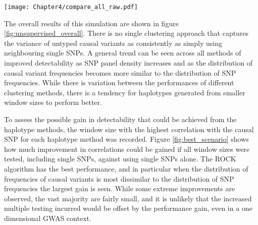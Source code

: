 \begin{sidewaysfigure}
\begin{center}
\begin{center}
\texttt{[image: Chapter4/compare\_all\_raw.pdf]}
\caption[Detection of hidden variants using unsupervised haplotype clustering]{Detection of `untyped' causal variants in different genomic architectures. Box and whisker plots show the distribution of best correlations between causal variant and clustered SNPs (rows 1-4) or single SNPs (row 5), for different causal variant frequency distributions (columns of boxes), and different SNP chip densities ($x$ axis). Each distribution comprises 500 simulated causal variants. Box and whisper plots represent, from top to bottom, $95^{th}$, $75^{th}$, $50^{th}$, $25^{th}$ and $5^{th}$ percentile values for the distribution of correlation values.}
\label{fig:unsupervised_overall}
\end{center}
\end{center}
\end{sidewaysfigure}

The overall results of this simulation are shown in figure \ref{fig:unsupervised_overall}. There is no single clustering approach that captures the variance of untyped causal variants as consistently as simply using neighbouring single SNPs. A general trend can be seen across all methods of improved detectability as SNP panel density increases and as the distribution of causal variant frequencies becomes more similar to the distribution of SNP frequencies. While there is variation between the performances of different clustering methods, there is a tendency for haplotypes generated from smaller window sizes to perform better.

To assess the possible gain in detectability that could be achieved from the haplotype methods, the window size with the highest correlation with the causal SNP for each haplotype method was recorded. Figure \ref{fig:best_scenario} shows how much improvement in correlations could be gained if all window sizes were tested, including single SNPs, against using single SNPs alone. The ROCK algorithm has the best performance, and in particular when the distribution of frequencies of causal variants is most dissimilar to the distribution of SNP frequencies the largest gain is seen. While some extreme improvements are observed, the vast majority are fairly small, and it is unlikely that the increased multiple testing incurred would be offset by the performance gain, even in a one dimensional GWAS context.


